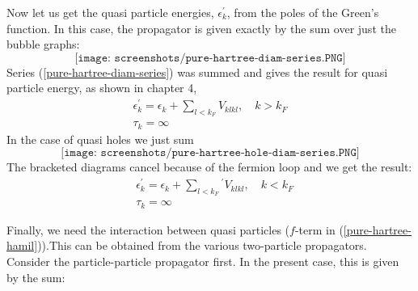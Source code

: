 Now let us get the quasi particle energies, $\epsilon_k^{\prime}$, from the poles of the Green's function. In this case, the propagator is given exactly by the sum over just the bubble graphs:
\begin{equation}
    \texttt{[image: screenshots/pure-hartree-diam-series.PNG]}
    \label{pure-hartree-diam-series}
\end{equation}
Series (\ref{pure-hartree-diam-series}) was summed and gives the result for quasi particle energy, as shown in chapter 4,
\begin{equation}\begin{array}{l}
\epsilon_{k}^{\prime}=\epsilon_{k}+\sum_{l<k_F} V_{k l k l}, \quad k>k_{F} \\
\tau_{k}=\infty
\end{array}\end{equation}
In the case of quasi holes we just sum
\begin{equation}
    \texttt{[image: screenshots/pure-hartree-hole-diam-series.PNG]}
    \label{pure-hartree-hole-diam-series}
\end{equation}
The bracketed diagrams cancel because of the fermion loop and we get the result:
\begin{equation}\begin{aligned}
&\epsilon_{k}^{\prime}=\epsilon_{k}+\sum_{l<k_{F}}{}^{\prime} V_{k l k l}, \quad k<k_{F}\\
&\tau_{k}=\infty
\end{aligned}\end{equation}

Finally, we need the interaction between quasi particles ($f$-term in (\ref{pure-hartree-hamil})).This can be obtained from the various two-particle propagators. Consider the particle-particle propagator first. In the present case, this is given by the sum:
